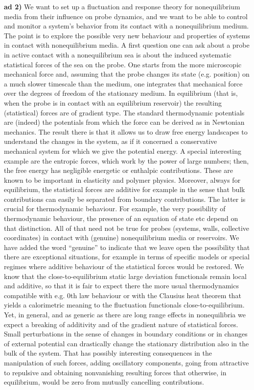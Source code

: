 {\bf ad 2)} We want to set up a fluctuation and response theory for nonequilibrium media from their influence on probe  dynamics, and we want to be able to control and monitor a system’s behavior from its contact with a nonequilibrium medium. The point is to explore the possible very new behaviour and properties of systems in contact with nonequilibrium media. A first question one can ask about a probe in active contact with a nonequilibrium sea is about the induced systematic statistical forces of the sea on the probe.  One starts from the more microscopic mechanical force and, assuming that the probe changes its state (e.g. position) on a much slower timescale than the medium, one integrates that mechanical force over the degrees of freedom of the stationary medium.  In equilibrium (that is, when the probe is in contact with an equilibrium reservoir) the resulting (statistical) forces are of gradient type.  The standard thermodynamic potentials are (indeed) the potentials from which the force can be derived as in Newtonian mechanics. The result there is that it allows us to draw free energy landscapes to understand the changes in the system, as if it concerned a conservative mechanical system for which we give the potential energy.  A special interesting example are the entropic forces, which work by the power of large numbers; then, the free energy has negligible energetic or enthalpic contributions.  These are known to be important in elasticity and polymer physics. Moreover, always for equilibrium, the statistical forces are additive for example in the sense that bulk contributions can easily be separated from boundary contributions.  The latter is crucial for thermodynamic behaviour.  For example, the very possibility of thermodynamic behaviour, the presence of an equation of state etc depend on that distinction.  All of that need not be true for probes (systems, walls, collective coordinates) in contact with (genuine) nonequilibrium media or reservoirs.  We have added the word “genuine” to indicate that we leave open the possibility that there are exceptional situations, for example in terms of specific models or special regimes where additive behaviour of the statistical forces would be restored.  We know that the close-to-equilibrium static large deviation functionals remain local and additive, so that it is fair to expect there the more usual thermodynamics compatible with e.g. 0th law behaviour or with the Clausius heat theorem that yields a calorimetric meaning to the fluctuation functionals close-to-equilibrium.   Yet, in general, and as generic as there are long range effects in nonequilibria we expect a breaking of additivity and of the gradient nature of statistical forces. Small perturbations in the sense of changes in boundary conditions or in changes of external potential can drastically change the stationary distribution also in the bulk of the system.  That has possibly interesting consequences in the manipulation of such forces, adding oscillatory components, going from attractive to repulsive and obtaining nonvanishing resulting forces that otherwise, in equilibrium, would be zero from mutually cancelling contributions. 
